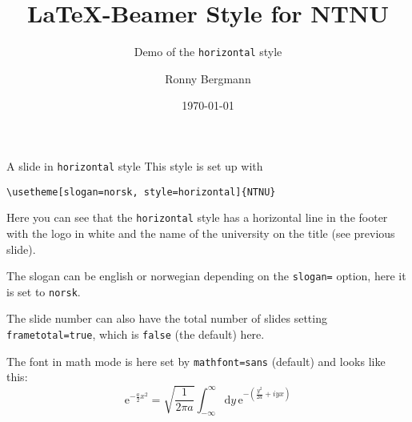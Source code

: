 \documentclass[aspectratio=169]{beamer}
\title{\LaTeX{}-Beamer Style for NTNU}
\subtitle{Demo of the  \texttt{horizontal} style}
\author{Ronny Bergmann}
\date{\today}
\begin{document}
	\maketitle
    \begin{frame}[fragile]{A slide in \texttt{horizontal} style}
        This style is set up with

        \lstinline!\usetheme[slogan=norsk, style=horizontal]{NTNU}!

        Here you can see that the \texttt{horizontal} style has a horizontal line in the footer with the logo in white and the name of the university on the title (see previous slide).

        The slogan can be english or norwegian depending on the \lstinline!slogan=! option, here it is set to \lstinline!norsk!.

        The slide number can also have the total number of slides setting \lstinline!frametotal=true!, which is \lstinline!false! (the default) here.
        
        The font in math mode is here set by \lstinline!mathfont=sans! (default) and looks like this: \[\mathrm{e}^{-\frac{a}{2}x^2} = \sqrt{\frac{1}{2\pi a}} \int_{-\infty}^\infty\mathrm{d}y\, \mathrm{e}^{-\left(\frac{y^2}{2a} +iy x\right)}\]
    \end{frame}
\end{document}

